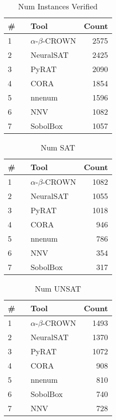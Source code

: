 \begin{table}[h]
\begin{center}
\caption{Num Instances Verified} \label{tab:stats1}
{\setlength{\tabcolsep}{2pt}
\begin{tabular}[h]{@{}llr@{}}
\toprule
\textbf{\# ~} & \textbf{Tool} & \textbf{Count}\\
\midrule
1 & $\alpha$-$\beta$-CROWN & 2575 \\
2 & NeuralSAT & 2425 \\
3 & PyRAT & 2090 \\
4 & CORA & 1854 \\
5 & nnenum & 1596 \\
6 & NNV & 1082 \\
7 & SobolBox & 1057 \\
\bottomrule
\end{tabular}
}
\end{center}
\end{table}




\begin{table}[h]
\begin{center}
\caption{Num SAT} \label{tab:stats2}
{\setlength{\tabcolsep}{2pt}
\begin{tabular}[h]{@{}llr@{}}
\toprule
\textbf{\# ~} & \textbf{Tool} & \textbf{Count}\\
\midrule
1 & $\alpha$-$\beta$-CROWN & 1082 \\
2 & NeuralSAT & 1055 \\
3 & PyRAT & 1018 \\
4 & CORA & 946 \\
5 & nnenum & 786 \\
6 & NNV & 354 \\
7 & SobolBox & 317 \\
\bottomrule
\end{tabular}
}
\end{center}
\end{table}




\begin{table}[h]
\begin{center}
\caption{Num UNSAT} \label{tab:stats3}
{\setlength{\tabcolsep}{2pt}
\begin{tabular}[h]{@{}llr@{}}
\toprule
\textbf{\# ~} & \textbf{Tool} & \textbf{Count}\\
\midrule
1 & $\alpha$-$\beta$-CROWN & 1493 \\
2 & NeuralSAT & 1370 \\
3 & PyRAT & 1072 \\
4 & CORA & 908 \\
5 & nnenum & 810 \\
6 & SobolBox & 740 \\
7 & NNV & 728 \\
\bottomrule
\end{tabular}
}
\end{center}
\end{table}



